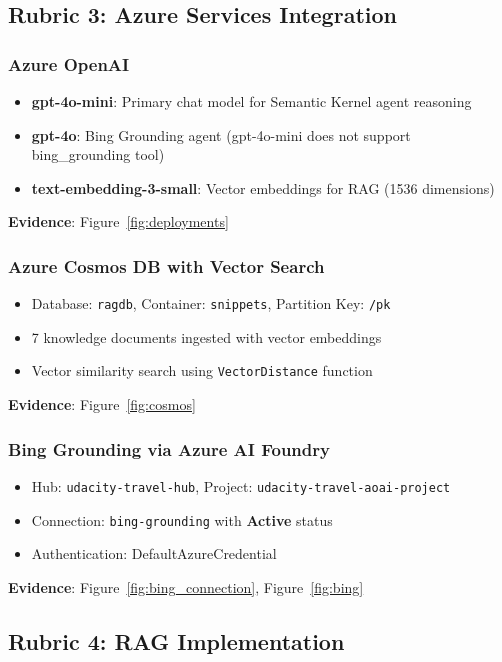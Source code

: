 \documentclass[11pt,a4paper]{article}
\begin{document}
\subsection{Rubric 3: Azure Services Integration}

\subsubsection{Azure OpenAI}
\begin{itemize}[noitemsep]
    \item \textbf{gpt-4o-mini}: Primary chat model for Semantic Kernel agent reasoning
    \item \textbf{gpt-4o}: Bing Grounding agent (gpt-4o-mini does not support bing\_grounding tool)
    \item \textbf{text-embedding-3-small}: Vector embeddings for RAG (1536 dimensions)
\end{itemize}
\textbf{Evidence}: Figure~\ref{fig:deployments}

\subsubsection{Azure Cosmos DB with Vector Search}
\begin{itemize}[noitemsep]
    \item Database: \texttt{ragdb}, Container: \texttt{snippets}, Partition Key: \texttt{/pk}
    \item 7 knowledge documents ingested with vector embeddings
    \item Vector similarity search using \texttt{VectorDistance} function
\end{itemize}
\textbf{Evidence}: Figure~\ref{fig:cosmos}

\subsubsection{Bing Grounding via Azure AI Foundry}
\begin{itemize}[noitemsep]
    \item Hub: \texttt{udacity-travel-hub}, Project: \texttt{udacity-travel-aoai-project}
    \item Connection: \texttt{bing-grounding} with \textbf{Active} status
    \item Authentication: DefaultAzureCredential
\end{itemize}
\textbf{Evidence}: Figure~\ref{fig:bing_connection}, Figure~\ref{fig:bing}

\subsection{Rubric 4: RAG Implementation}
\end{document}
